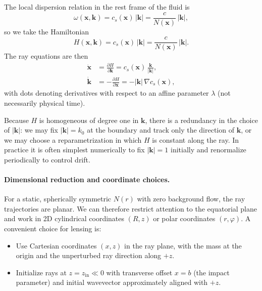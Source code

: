 \documentclass[11pt]{article}
\begin{document}
The local dispersion relation in the rest frame of the fluid is
\begin{equation}
  \omega(\mathbf{x},\mathbf{k})
  = c_s(\mathbf{x})\,|\mathbf{k}|
  = \frac{c}{N(\mathbf{x})}\,|\mathbf{k}|,
\end{equation}
so we take the Hamiltonian
\begin{equation}
  H(\mathbf{x},\mathbf{k})
  = c_s(\mathbf{x})\,|\mathbf{k}|
  = \frac{c}{N(\mathbf{x})}\,|\mathbf{k}|.
\end{equation}
The ray equations are then
\begin{align}
  \dot{\mathbf{x}}
  &= \frac{\partial H}{\partial \mathbf{k}}
   = c_s(\mathbf{x})\,\frac{\mathbf{k}}{|\mathbf{k}|},
  \\
  \dot{\mathbf{k}}
  &= -\frac{\partial H}{\partial \mathbf{x}}
   = -|\mathbf{k}|\,\nabla c_s(\mathbf{x}),
\end{align}
with dots denoting derivatives with respect to an affine parameter
$\lambda$ (not necessarily physical time).

Because $H$ is homogeneous of degree one in $\mathbf{k}$, there is a
redundancy in the choice of $|\mathbf{k}|$: we may fix
$|\mathbf{k}| = k_0$ at the boundary and track only the direction of
$\mathbf{k}$, or we may choose a reparametrization in which $H$ is
constant along the ray.
In practice it is often simplest numerically to fix
$|\mathbf{k}| = 1$ initially and renormalize periodically to control
drift.

\paragraph{Dimensional reduction and coordinate choices.}

For a static, spherically symmetric $N(r)$ with zero background flow, the
ray trajectories are planar.
We can therefore restrict attention to the equatorial plane and work in
2D cylindrical coordinates $(R,z)$ or polar coordinates $(r,\varphi)$.
A convenient choice for lensing is:

\begin{itemize}
  \item Use Cartesian coordinates $(x,z)$ in the ray plane, with the mass
        at the origin and the unperturbed ray direction along $+z$.
  \item Initialize rays at $z = z_\mathrm{in} \ll 0$ with transverse
        offset $x = b$ (the impact parameter) and initial wavevector
        approximately aligned with $+z$.
\end{itemize}
\end{document}

